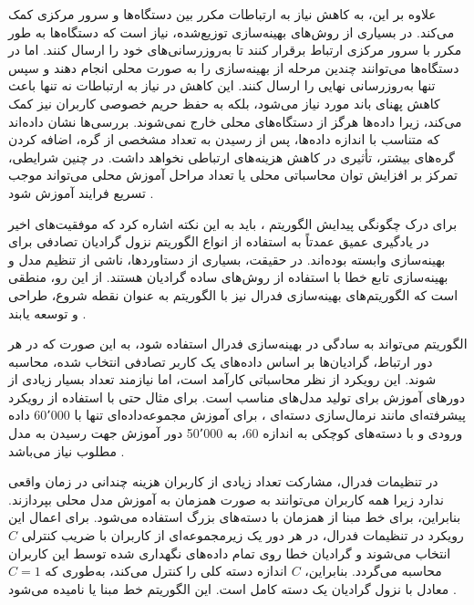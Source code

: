 علاوه بر این،
به کاهش نیاز به ارتباطات مکرر بین دستگاه‌ها و سرور مرکزی کمک می‌کند. در بسیاری از روش‌های بهینه‌سازی توزیع‌شده، نیاز است که دستگاه‌ها به طور مکرر با سرور مرکزی ارتباط برقرار کنند تا به‌روزرسانی‌های خود را ارسال کنند. اما در
دستگاه‌ها می‌توانند چندین مرحله از بهینه‌سازی را به صورت محلی انجام دهند و سپس تنها به‌روزرسانی نهایی را ارسال کنند. این کاهش در نیاز به ارتباطات نه تنها باعث کاهش پهنای باند مورد نیاز می‌شود، بلکه به حفظ حریم خصوصی کاربران نیز کمک می‌کند، زیرا داده‌ها هرگز از دستگاه‌های محلی خارج نمی‌شوند. بررسی‌ها نشان داده‌اند که متناسب با اندازه داده‌ها، پس از رسیدن به تعداد مشخصی از گره، اضافه کردن گره‌های بیشتر، تأثیری در کاهش هزینه‌های ارتباطی نخواهد داشت. در چنین شرایطی، تمرکز بر افزایش توان محاسباتی محلی یا تعداد مراحل آموزش محلی می‌تواند موجب تسریع فرایند آموزش شود
\cite{mcmahan2017communication}.

برای درک چگونگی پیدایش الگوریتم
%
، باید به این نکته اشاره کرد که موفقیت‌های اخیر در یادگیری عمیق عمدتاً به استفاده از انواع الگوریتم نزول گرادیان تصادفی%
برای بهینه‌سازی وابسته بوده‌اند. در حقیقت، بسیاری از دستاوردها، ناشی از تنظیم مدل و بهینه‌سازی تابع خطا با استفاده از روش‌های ساده گرادیان هستند. از این رو، منطقی است که الگوریتم‌های بهینه‌سازی فدرال نیز با الگوریتم
به عنوان نقطه شروع، طراحی و توسعه یابند
\cite{mcmahan2017communication}.


الگوریتم
می‌تواند به سادگی در بهینه‌سازی فدرال استفاده شود، به این صورت که در هر دور ارتباط، گرادیان‌ها بر اساس داده‌های یک کاربر تصادفی انتخاب شده، محاسبه ‌شوند. این رویکرد از نظر محاسباتی کارآمد است، اما نیازمند تعداد بسیار زیادی از دورهای آموزش برای تولید مدل‌های مناسب است.
برای مثال حتی با استفاده از رویکرد پیشرفته‌ای مانند نرمال‌سازی دسته‌ای%
%
، برای آموزش مجموعه‌داده‌ای تنها با 60٬000 داده ورودی و
با دسته‌های کوچکی به اندازه 60، به 50٬000 دور آموزش جهت رسیدن به مدل مطلوب نیاز می‌باشد
\cite{ioffe2015batch}.

در تنظیمات فدرال، مشارکت تعداد زیادی از کاربران هزینه چندانی در زمان واقعی ندارد زیرا همه کاربران می‌توانند به صورت همزمان به آموزش مدل محلی بپردازند. بنابراین، برای خط مبنا از
همزمان با دسته‌های بزرگ استفاده می‌شود. برای اعمال این رویکرد در تنظیمات فدرال، در هر دور یک زیرمجموعه‌ای از کاربران با ضریب کنترلی 
$C$
انتخاب می‌شوند و گرادیان خطا روی تمام داده‌های نگهداری شده توسط این کاربران محاسبه می‌گردد. بنابراین،
$C$
اندازه دسته کلی را کنترل می‌کند، به‌طوری که
$C = 1$
معادل با نزول گرادیان یک دسته کامل است. این الگوریتم خط مبنا
یا
نامیده می‌شود
\cite{mcmahan2017communication}.


